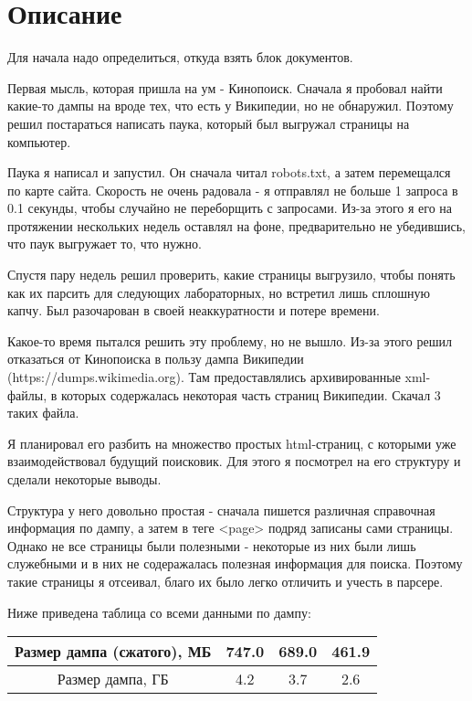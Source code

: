 \section{Описание}
Для начала надо определиться, откуда взять блок документов. 

Первая мысль, которая пришла на ум - Кинопоиск. Сначала я пробовал найти какие-то дампы на вроде тех, что есть у Википедии, но не обнаружил. Поэтому решил постараться написать паука, который был выгружал страницы на компьютер. 

Паука я написал и запустил. Он сначала читал robots.txt, а затем перемещался по карте сайта. Скорость не очень радовала - я отправлял не больше 1 запроса в 0.1 секунды, чтобы случайно не переборщить с запросами. Из-за этого я его на протяжении нескольких недель оставлял на фоне, предварительно не убедившись, что паук выгружает то, что нужно.

Спустя пару недель решил проверить, какие страницы выгрузило, чтобы понять как их парсить для следующих лабораторных, но встретил лишь сплошную капчу. Был разочарован в своей неаккуратности и потере времени.

Какое-то время пытался решить эту проблему, но не вышло. Из-за этого решил отказаться от Кинопоиска в пользу дампа Википедии \linebreak(https://dumps.wikimedia.org). Там предоставлялись архивированные xml-файлы, в которых содержалась некоторая часть страниц Википедии. Скачал 3 таких файла.

Я планировал его разбить на множество простых html-страниц, с которыми уже взаимодействовал будущий поисковик. Для этого я посмотрел на его структуру и сделали некоторые выводы.

Структура у него довольно простая - сначала пишется различная справочная информация по дампу, а затем в теге <page> подряд записаны сами страницы. Однако не все страницы были полезными - некоторые из них были лишь служебными и в них не содеражалась полезная информация для поиска. Поэтому такие страницы я отсеивал, благо их было легко отличить и учесть в парсере.

Ниже приведена таблица со всеми данными по дампу:
\begin{center}
\begin{tabular}{ |c|c|c|c| } 
 \hline
 Размер дампа (сжатого), МБ & 747.0 & 689.0 & 461.9\\
 \hline
 Размер дампа, ГБ & 4.2 & 3.7 & 2.6 \\
 \hline
\end{tabular}
\end{center}

